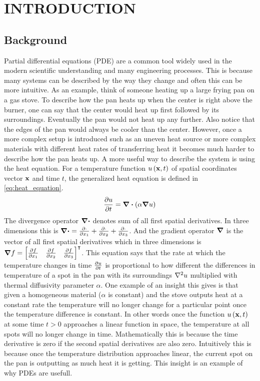\chapter{INTRODUCTION}
\section{Background}\label{sec:background} %
\noindent Partial differential equations (PDE) are a common tool widely used in the modern scientific understanding and many engineering processes. This is because many systems can be described by the way they change and often this can be more intuitive. As an example, think of someone heating up a large frying pan on a gas stove. To describe how the pan heats up when the center is right above the burner, one can say that the center would heat up first followed by its surroundings. Eventually the pan would not heat up any further. Also notice that the edges of the pan would always be cooler than the center. However, once a more complex setup is introduced such as an uneven heat source or more complex materials with different heat rates of transferring heat it becomes much harder to describe how the pan heats up. A more useful way to describe the system is using the heat equation. For a temperature function \(u\left(\vb{x},t\right)\) of spatial coordinates vector \(\vb{x}\) and time \(t\), the generalized heat equation is defined in \cref{eq:heat_equation}.
\begin{equation} \label{eq:heat_equation}
    \pdv{u}{t}=\divergence{\left(\alpha \gradient u\right)}
\end{equation}
The divergence operator \(\divergence \) denotes sum of all first spatial derivatives. In three dimensions this is \(\divergence=\pdv{\cdot}{x_1}+\pdv{\cdot}{x_2}+\pdv{\cdot}{x_3}\). And the gradient operator \(\gradient \) is the vector of all first spatial derivatives which in three dimensions is \(\gradient{f} = {\begin{bmatrix}\pdv{f}{x_1} & \pdv{f}{x_2} & \pdv{f}{x_3}\end{bmatrix}}^{\intercal}\). This equation says that the rate at which the temperature changes in time \(\pdv{u}{t}\) is proportional to how different the differences in temperature of a spot in the pan with its surroundings \(\laplacian{u}\) multiplied with thermal diffusivity parameter \(\alpha \). One example of an insight this gives is that given a homogeneous material (\(\alpha \) is constant) and the stove outputs heat at a constant rate the temperature will no longer change for a particular point once the temperature difference is constant. In other words once the function \(u\left(\vb{x},t\right)\) at some time \(t > 0 \) approaches a linear function in space, the temperature at all spots will no longer change in time. Mathematically this is because the time derivative is zero if the second spatial derivatives are also zero. Intuitively this is because once the temperature distribution approaches linear, the current spot on the pan is outputting as much heat it is getting. This insight is an example of why PDEs are usefull.

